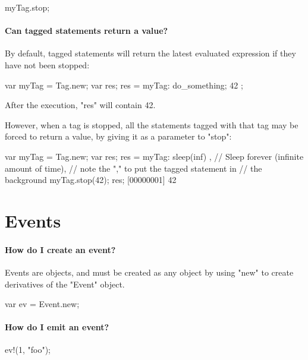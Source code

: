 \begin{urbifixme}
myTag.stop;
\end{urbifixme}

\paragraph{Can tagged statements return a value?}


By default, tagged statements will return the latest evaluated expression if
they have not been stopped:

\begin{urbifixme}
var myTag = Tag.new;
var res;
res = { myTag: { do_something; 42 } };
\end{urbifixme}

After the execution, "res" will contain 42.

However, when a tag is stopped, all the statements tagged with that tag may
be forced to return a value, by giving it as a parameter to "stop":

\begin{urbifixme}
var myTag = Tag.new;
var res;
{ res = { myTag: sleep(inf) } }, // Sleep forever (infinite amount of time),
                                 // note the "," to put the tagged statement in
                                 // the background
myTag.stop(42);
res;
[00000001] 42
\end{urbifixme}

\section{Events}

\paragraph{How do I create an event?}
Events are objects, and must be created as any object by using "new" to create
derivatives of the "Event" object.

\begin{urbifixme}
var ev = Event.new;
\end{urbifixme}

\paragraph{How do I emit an event?}

\begin{urbifixme}
ev!(1, "foo");
\end{urbifixme}

